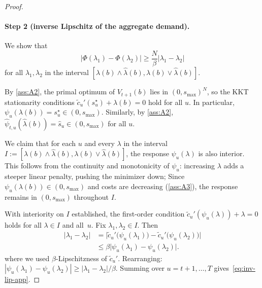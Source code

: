\documentclass{uai2026} %
\newcommand{\1}{\mathbf{1}}
\begin{document}
\begin{proof}
  \paragraph{Step 2 (inverse Lipschitz of the aggregate demand).}
  We show that
  \begin{equation}
    \label{eq:inv-lip-app}
    |\Phi(\lambda_1)-\Phi(\lambda_2)|
    \ge \frac{N}{\beta}|\lambda_1-\lambda_2|
  \end{equation}
  for all $\lambda_1,\lambda_2$ in the interval
  $[\lambda(b) \wedge \hat{\lambda}(b),
  \lambda(b) \vee \hat{\lambda}(b)]$.

  By \ref{ass:A2}, the primal optimum of $V_{t+1}(b)$
  lies in $(0,s_{\max})^{N}$, so the KKT stationarity conditions
  $\tilde{c}_u'(s_u^{\star})+\lambda(b)=0$ hold for all $u$.
  In particular, $\psi_u(\lambda(b)) = s_u^{\star} \in (0,s_{\max})$.
  Similarly, by \ref{ass:A2},
  $\hat{\psi}_{t,u}(\hat{\lambda}(b)) = \hat{s}_u \in (0,s_{\max})$
  for all $u$.

  We claim that for each $u$ and every $\lambda$ in the interval
  $I := [\lambda(b) \wedge \hat{\lambda}(b),
  \lambda(b) \vee \hat{\lambda}(b)]$,
  the response $\psi_u(\lambda)$ is also interior.
  This follows from the continuity and monotonicity of $\psi_u$:
  increasing $\lambda$ adds a steeper linear penalty, pushing the minimizer down;
  Since $\psi_u(\lambda(b)) \in (0,s_{\max})$
  and costs are decreasing (\ref{ass:A3}), the response remains in $(0,s_{\max})$ throughout $I$.

  With interiority on $I$ established, the first-order condition
  $\tilde{c}_u'(\psi_u(\lambda))+\lambda = 0$ holds
  for all $\lambda \in I$ and all~$u$.
  Fix $\lambda_1,\lambda_2 \in I$.
  Then
  \begin{equation*}
    \begin{aligned}
      |\lambda_1-\lambda_2|
      &= \bigl|
      \tilde{c}_u'\bigl(\psi_u(\lambda_1)\bigr)
      - \tilde{c}_u'\bigl(\psi_u(\lambda_2)\bigr)
      \bigr|\\
      &\le \beta\bigl|\psi_u(\lambda_1)
      - \psi_u(\lambda_2)\bigr|.
    \end{aligned}
  \end{equation*}
  where we used $\beta$-Lipschitzness of $\tilde{c}_u'$.
  Rearranging: $|\psi_u(\lambda_1)
  - \psi_u(\lambda_2)| \ge |\lambda_1-\lambda_2|/\beta$.
  Summing over $u = t+1,\dots,T$ gives~\eqref{eq:inv-lip-app}.


\end{proof}
\end{document}
